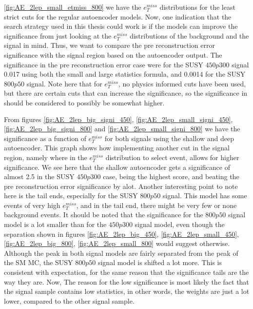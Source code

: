 \ref{fig:AE_2lep_small_etmiss_800} we have the $e_T^{miss}$ distributions for 
the least strict cuts for the regular autoencoder models. Now, one indication that the search strategy 
used in this thesis could work is if the models can improve the significance from just looking at 
the $e_T^{miss}$ distributions of the background and the signal in mind. Thus, we want to compare the pre 
reconstruction error significance with the signal region based on the autoencoder output. The significance 
in the pre reconstruction error case were for the SUSY $450p300$ signal 0.017 using both the small and large 
statistics formula, and 0.0014 for the SUSY $800p50$ signal. Note here that for $e_T^{miss}$, no physics 
informed cuts have been used, but there are certain cuts that can increase the significance, so the significance
in should be considered to possibly be somewhat higher. \par
From figures \ref{fig:AE_2lep_big_signi_450}, 
\ref{fig:AE_2lep_small_signi_450}, \ref{fig:AE_2lep_big_signi_800} and  \ref{fig:AE_2lep_small_signi_800} 
we have the significance as a function of $e_T^{miss}$ for both signals using the shallow and deep autoencoder. 
This graph shows how implementing another cut in the signal region, namely where in the $e_T^{miss}$ distribution 
to select event, allows for higher significance. We see here that the shallow autoencoder gets a significance of 
almost 2.5 in the SUSY $450p300$ case, being the highest score, and beating the pre reconstruction error significance 
by alot. Another interesting point to note here is the tail ends, especially for the SUSY $800p50$ signal. 
This model has some events of very high $e_T^{miss}$, and in the tail end, there might be very few or none 
background events. It should be noted that the significance for the $800p50$ signal model is a lot smaller than 
for the $450p300$ signal model, even though the separation shown in figures \ref{fig:AE_2lep_big_450}, 
\ref{fig:AE_2lep_small_450}, \ref{fig:AE_2lep_big_800}, \ref{fig:AE_2lep_small_800} would suggest otherwise. 
Although the peak in both signal models are fairly separated from the peak of the SM MC, the SUSY $800p50$ 
signal model is shifted a lot more. This is consistent with expectation, for the same reason that the significance 
tails are the way they are.  Now, The reason for the low significance is most likely the fact that the signal 
sample contains low statistics, in other words, the weights are just a lot lower, compared to the other signal 
sample. \par

